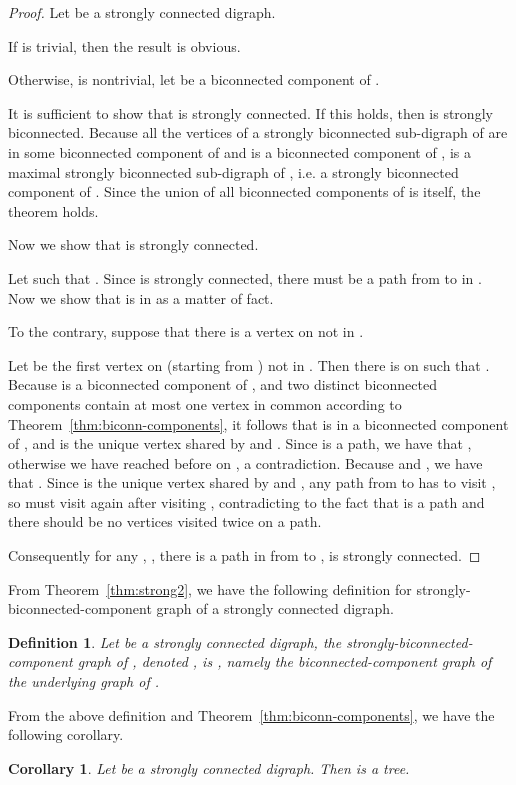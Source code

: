 \documentclass{article}
\newtheorem{cor}[thm]{Corollary}
\newtheorem{defn}[thm]{Definition}
\begin{document}
\begin{proof}

Let  be a strongly connected digraph.

If  is trivial, then the result is obvious.

Otherwise,  is nontrivial, let  be a biconnected component of
.

It is sufficient to show that  is strongly connected. If
this holds, then  is strongly biconnected. Because all the
vertices of a strongly biconnected sub-digraph of  are in some
 biconnected component of  and  is a biconnected component of ,
 is a maximal strongly biconnected sub-digraph of , i.e.
a strongly biconnected component of . Since the union of all
biconnected components of  is 
itself, the theorem holds.

Now we show that  is strongly connected.

Let  such that . Since  is strongly
connected, there must be a path  from  to  in . Now we
show that  is in  as a matter of fact.

To the contrary, suppose that there is a vertex on  not in
.

Let  be the first vertex on  (starting from ) not in
. Then there is  on  such that
. Because  is a biconnected component
of , and two distinct biconnected components contain
at most one vertex in common according to
Theorem~\ref{thm:biconn-components}, it follows that  is
in a biconnected component  of ,
and  is the unique vertex shared by  and .
Since  is a path, we have that , otherwise we
have reached  before  on , a contradiction. Because
 and , we have that . Since  is the unique vertex
shared by  and , any path from  to  has to visit , so  must
visit  again after visiting , contradicting to
the fact that  is a path and there should be no vertices visited
twice on a path.

Consequently for any , , there is a path in
 from  to ,  is strongly connected.
\end{proof}


From Theorem~\ref{thm:strong2}, we have the following definition for
strongly-biconnected-component graph of a strongly connected
digraph.

\begin{defn}
Let  be a strongly connected digraph, the
strongly-biconnected-component graph of , denoted
, is
, namely the
biconnected-component graph of the underlying graph of .
\end{defn}

From the above definition and Theorem~\ref{thm:biconn-components},
we have the following corollary.
\begin{cor}\label{cor:G_bis}
Let  be a strongly connected digraph. Then 
is a tree.
\end{cor}
\end{document}
